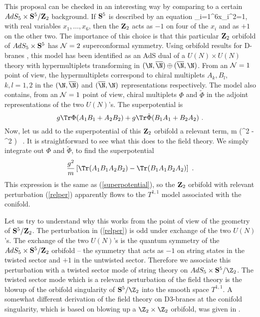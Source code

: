 This proposal can be checked in an interesting
way by comparing to a certain
$AdS_5\times {\bf S}^5/{\bf Z}_2$ background.  If ${\bf S}^5$ is described
by an equation
\be\label{beqnop}
\sum_{i=1}^6x_i^2=1,
\ee
with real variables $x_1,\dots, x_6$,
then the ${\bf Z}_2$ acts as $-1$ on four of the $x_i$ and
as $+1$ on the other two.  The importance of this choice is that this
particular
 ${\bf Z}_2$ orbifold of $AdS_5\times {\bf S}^5$
  has ${\cal N}=2$ superconformal symmetry.
Using orbifold results for D-branes \cite{dm}, this model has been 
identified \cite{ks} as an AdS dual of a $U(N)\times U(N)$ theory
with hypermultiplets transforming in
$(\N,\overline\N)\oplus (\overline \N,\N)$. From an ${\cal N}=1$ point of 
view, the hypermultiplets                
correspond to chiral multiplets $A_k,B_l$, $k,l=1,2$ in the 
$(\N,\overline \N)$ and $(\overline \N,\N)$  representations respectively.  
The model also contains, from an ${\cal N}=1$ point of view, chiral multiplets
$\Phi$ and $\tilde \Phi$ in the adjoint representations of the two
$U(N)$'s. 
The superpotential is
$$ g \Tr \Phi (A_1 B_1 + A_2 B_2) + g \Tr \tilde \Phi (B_1 A_1 + B_2 A_2)
\ .
$$
Now, let us add to the superpotential of this ${\bf Z}_2$ orbifold
a relevant term,
\be \label{relper}{m} (\Tr \Phi^2 - \Tr \tilde \Phi^2 )
\ .
\ee
It is straightforward to see what this does to the field theory.
We simply integrate out $\Phi$ and $\tilde \Phi$,
to find the superpotential
$$ {g^2\over m} \left [\Tr (A_1 B_1 A_2 B_2) - \Tr (B_1 A_1 B_2 A_2)
\right ]\ .
$$
This expression is the same as (\ref{superpotential}), so the
${\bf Z}_2$ orbifold with relevant perturbation (\ref{relper}) 
apparently flows to the $T^{1,1}$ model associated with the conifold.

Let us try to understand why this works from the point of view of the
geometry of ${\bf S}^5/{\bf Z}_2$.  The perturbation in (\ref{relper})
is odd under exchange of the two $U(N)$'s.  The exchange of the two $U(N)$'s
is the quantum symmetry of the $AdS_5\times {\bf S}^5/{\bf Z}_2$ orbifold
-- the symmetry that acts as $-1$ on string states in the twisted sector
and $+1$ in the untwisted  sector.  Therefore we
associate this perturbation with a twisted sector mode of string
theory on $AdS_5\times {\bf S}^5/\Z_2$.  The twisted sector mode
which is a relevant perturbation of the field theory is the blowup
of the orbifold singularity of ${\bf S}^5/\Z_2$ into the smooth space 
$T^{1,1}$. A somewhat different derivation of the field theory
on D3-branes at the conifold singularity, which is based on blowing
up a $\Z_2\times \Z_2$ orbifold, was given in \cite{MP}.

